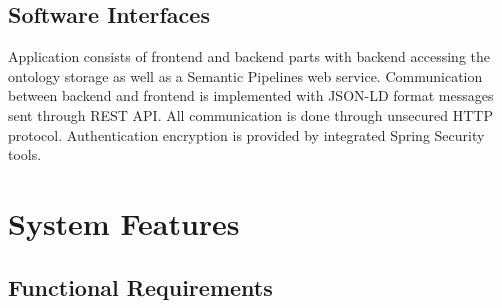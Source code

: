 \documentclass{article}
\begin{document}
\subsection{Software Interfaces}
Application consists of frontend and backend parts with backend accessing the ontology storage as well as a Semantic Pipelines web service. Communication between backend and frontend is implemented with JSON-LD format messages sent through REST API. All communication is done through unsecured HTTP protocol. Authentication encryption is provided by integrated Spring Security tools. 
\section{System Features}
\subsection{Functional Requirements}
\label{sec:features}
\end{document}
